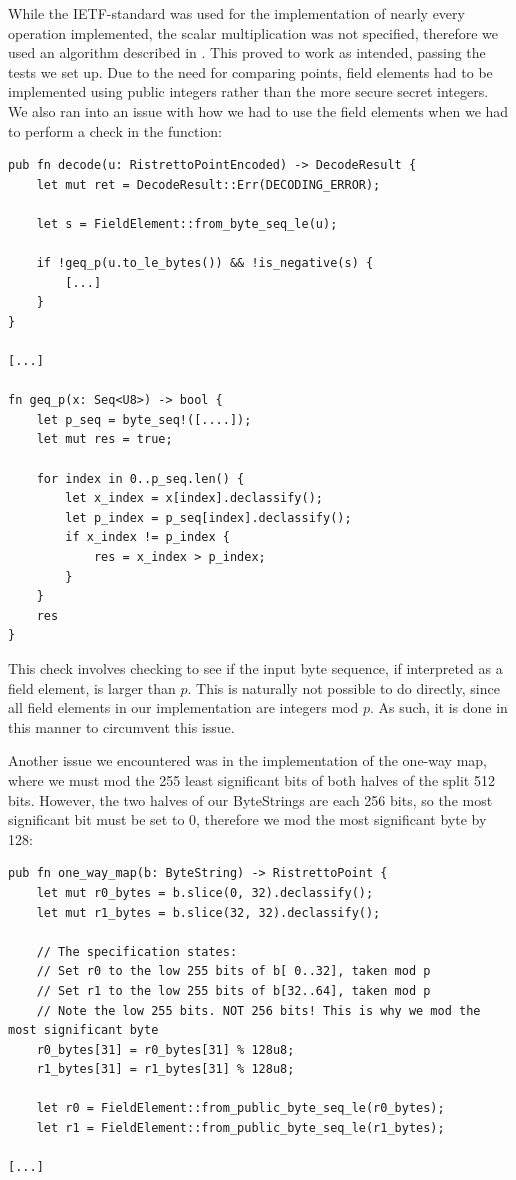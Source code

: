 \documentclass{article}
\newcommand*\ttvar[1]{\texttt{\expandafter\dottvar\detokenize{#1}\relax}}
\newcommand*\dottvar[1]{\ifx\relax#1\else
  \expandafter\ifx\string_#1\string_\allowbreak\else#1\fi
  \expandafter\dottvar\fi}
\begin{document}
While the IETF-standard was used for the implementation of nearly every
operation implemented, the scalar multiplication was not specified,
therefore we used an algorithm described in \cite{elliptic-curves}. This
proved to work as intended, passing the tests we set up. Due to the
need for comparing points, field elements had to be implemented using
public integers rather than the more secure secret integers. We also
ran into an issue with how we had to use the field elements when we
had to perform a check in the \ttvar{decode()} function:

\begin{lstlisting}
pub fn decode(u: RistrettoPointEncoded) -> DecodeResult {
	let mut ret = DecodeResult::Err(DECODING_ERROR);

	let s = FieldElement::from_byte_seq_le(u);

	if !geq_p(u.to_le_bytes()) && !is_negative(s) {
		[...]
	}
}

[...]

fn geq_p(x: Seq<U8>) -> bool {
	let p_seq = byte_seq!([....]);
	let mut res = true;

	for index in 0..p_seq.len() {
		let x_index = x[index].declassify();
		let p_index = p_seq[index].declassify();
		if x_index != p_index {
			res = x_index > p_index;
		}
	}
	res
}
\end{lstlisting}

This check involves checking to see if the input byte sequence,
if interpreted as a field element, is larger than $p$. This is
naturally not possible to do directly, since all field elements in
our implementation are integers mod $p$. As such, it is done in this
manner to circumvent this issue.

Another issue we encountered was in the implementation of the one-way
map, where we must mod the 255 least significant bits of both halves
of the split 512 bits. However, the two halves of our ByteStrings are
each 256 bits, so the most significant bit must be set to 0, therefore
we mod the most significant byte by 128:

\begin{lstlisting}
pub fn one_way_map(b: ByteString) -> RistrettoPoint {
	let mut r0_bytes = b.slice(0, 32).declassify();
	let mut r1_bytes = b.slice(32, 32).declassify();

	// The specification states:
	// Set r0 to the low 255 bits of b[ 0..32], taken mod p
	// Set r1 to the low 255 bits of b[32..64], taken mod p
	// Note the low 255 bits. NOT 256 bits! This is why we mod the most significant byte
	r0_bytes[31] = r0_bytes[31] % 128u8;
	r1_bytes[31] = r1_bytes[31] % 128u8;

	let r0 = FieldElement::from_public_byte_seq_le(r0_bytes);
	let r1 = FieldElement::from_public_byte_seq_le(r1_bytes);

[...]
\end{lstlisting}
\end{document}
